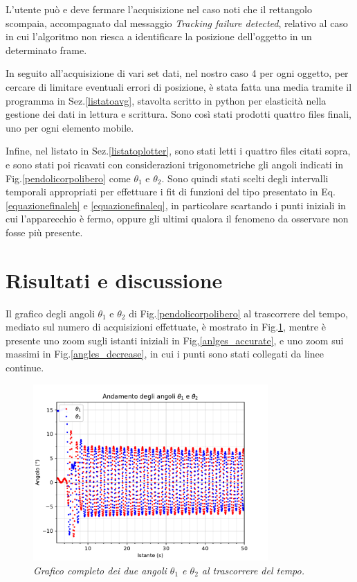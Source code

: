 \documentclass[11pt, a4paper, twoside]{article}
\begin{document}
L'utente può e deve fermare l'acquisizione nel caso noti che il rettangolo
scompaia, accompagnato dal messaggio \textit{Tracking failure detected}, relativo al
caso in cui l'algoritmo non riesca a identificare la posizione dell'oggetto
in un determinato frame.

In seguito all'acquisizione di vari set dati, nel nostro caso 4 per ogni oggetto,
per cercare di limitare eventuali errori di posizione, è stata fatta 
una media tramite il programma in Sez.\ref{listatoavg}, stavolta scritto
in python per elasticità nella gestione dei dati in lettura e scrittura.
Sono così stati prodotti quattro files finali, uno per ogni elemento mobile.

Infine, nel listato in Sez.\ref{listatoplotter}, sono stati letti i quattro
files citati sopra, e sono stati poi ricavati con considerazioni
trigonometriche gli angoli indicati in Fig.\ref{pendolicorpolibero} come
$\theta_1$ e $\theta_2$. Sono quindi stati scelti degli intervalli 
temporali appropriati per effettuare i fit di funzioni del tipo presentato in 
Eq.\ref{equazionefinaleh} e 
\ref{equazionefinaleq}, in particolare scartando 
i punti iniziali in cui l'apparecchio è fermo, oppure gli ultimi 
qualora il fenomeno da osservare non fosse più presente.

\section{Risultati e discussione}
Il grafico degli angoli $\theta_1$ e $\theta_2$ di Fig.\ref{pendolicorpolibero} 
al trascorrere del tempo, mediato sul 
numero di acquisizioni effettuate, è mostrato in
Fig.\ref{angles_full}, mentre è presente uno zoom sugli istanti iniziali in Fig,\ref{anlges_accurate},
e uno zoom sui massimi in Fig.\ref{angles_decrease}, in cui i punti sono stati collegati 
da linee continue.

\begin{figure}[h!]
  \centering
  \includegraphics[width=0.8\textwidth]{../../media/plot/angles_full.pdf}
  \caption{\textit{Grafico completo dei due angoli $\theta_1$ e $\theta_2$ al trascorrere del tempo.} }
  \label{angles_full}
\end{figure}
\end{document}
